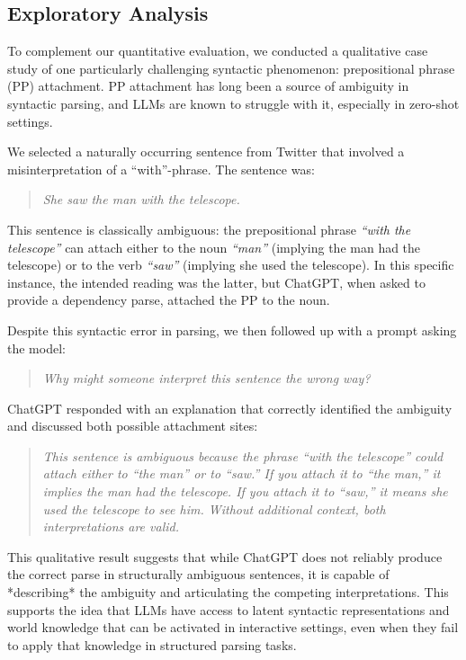 \subsection{Exploratory Analysis}
\label{subsec:pp-attachment}

To complement our quantitative evaluation, we conducted a qualitative case study of one particularly challenging syntactic phenomenon: prepositional phrase (PP) attachment. PP attachment has long been a source of ambiguity in syntactic parsing, and LLMs are known to struggle with it, especially in zero-shot settings.

We selected a naturally occurring sentence from Twitter that involved a misinterpretation of a “with”-phrase. The sentence was:

\begin{quote}
    \textit{She saw the man with the telescope.}
\end{quote}

This sentence is classically ambiguous: the prepositional phrase \textit{“with the telescope”} can attach either to the noun \textit{“man”} (implying the man had the telescope) or to the verb \textit{“saw”} (implying she used the telescope). In this specific instance, the intended reading was the latter, but ChatGPT, when asked to provide a dependency parse, attached the PP to the noun.

Despite this syntactic error in parsing, we then followed up with a prompt asking the model:

\begin{quote}
    \textit{Why might someone interpret this sentence the wrong way?}
\end{quote}

ChatGPT responded with an explanation that correctly identified the ambiguity and discussed both possible attachment sites:

\begin{quote}
    \textit{This sentence is ambiguous because the phrase “with the telescope” could attach either to “the man” or to “saw.” If you attach it to “the man,” it implies the man had the telescope. If you attach it to “saw,” it means she used the telescope to see him. Without additional context, both interpretations are valid.}
\end{quote}

This qualitative result suggests that while ChatGPT does not reliably produce the correct parse in structurally ambiguous sentences, it is capable of *describing* the ambiguity and articulating the competing interpretations. This supports the idea that LLMs have access to latent syntactic representations and world knowledge that can be activated in interactive settings, even when they fail to apply that knowledge in structured parsing tasks.

